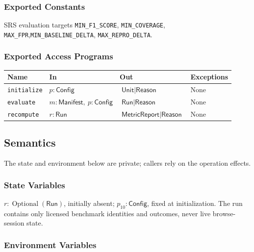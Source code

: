 \documentclass[12pt, titlepage]{article}
\newcommand{\ty}[1]{\textsf{#1}}
\newcommand{\Const}[1]{\texttt{#1}}
\begin{document}
\subsubsection{Exported Constants}

SRS evaluation targets \Const{MIN\_\allowbreak{}F1\_\allowbreak{}SCORE}, \Const{MIN\_\allowbreak{}COVERAGE}, \Const{MAX\_\allowbreak{}FPR},\newline \Const{MIN\_\allowbreak{}BASELINE\_\allowbreak{}DELTA}, \Const{MAX\_\allowbreak{}REPRO\_\allowbreak{}DELTA}.

\subsubsection{Exported Access Programs}

\begin{center}
\begin{tabular}{p{3.3cm} p{4cm} p{4cm} p{2.4cm}}
\hline
\textbf{Name} & \textbf{In} & \textbf{Out} & \textbf{Exceptions} \\
\hline
\texttt{initialize} & $p:\ty{Config}$ & $\ty{Unit}\mid\ty{Reason}$ & None \\
\texttt{evaluate} & $m:\ty{Manifest},\ p:\ty{Config}$ & $\ty{Run}\mid\ty{Reason}$ & None \\
\texttt{recompute} & $r:\ty{Run}$ & $\ty{MetricReport}\mid\ty{Reason}$ & None \\
\hline
\end{tabular}
\end{center}

\subsection{Semantics}

The state and environment below are private; callers rely on the operation effects.

\subsubsection{State Variables}

$r:\operatorname{Optional}(\ty{Run})$, initially absent; $p_{10}:\ty{Config}$, fixed at initialization. The run contains only licensed benchmark identities and outcomes, never live browse-session state.

\subsubsection{Environment Variables}
\end{document}
